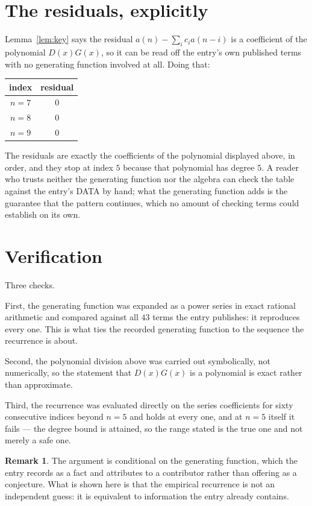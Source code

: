 \documentclass[11pt,a4paper]{article}
\theoremstyle{plain}
\theoremstyle{definition}
\newtheorem{remark}[theorem]{Remark}
\begin{document}
\section{The residuals, explicitly}

Lemma~\ref{lem:key} says the residual $a(n)-\sum_ic_ia(n-i)$ is a coefficient of the
polynomial $D(x)G(x)$, so it can be read off the entry's own published terms with no
generating function involved at all. Doing that:
\begin{center}
\begin{tabular}{cc}
index & residual \\ \hline
$n=7$ & $0$ \\
$n=8$ & $0$ \\
$n=9$ & $0$
\end{tabular}
\end{center}
The residuals are exactly the coefficients of the polynomial displayed above, in order, and
they stop at index $5$ because that polynomial has degree $5$. A reader who trusts
neither the generating function nor the algebra can check the table against the entry's DATA
by hand; what the generating function adds is the guarantee that the pattern continues, which
no amount of checking terms could establish on its own.

\section{Verification}

Three checks.

First, the generating function was expanded as a power series in exact rational arithmetic and
compared against all $43$ terms the entry publishes: it reproduces every one. This is
what ties the recorded generating function to the sequence the recurrence is about.

Second, the polynomial division above was carried out symbolically, not numerically, so the
statement that $D(x)G(x)$ is a polynomial is exact rather than approximate.

Third, the recurrence was evaluated directly on the series coefficients for sixty consecutive
indices beyond $n=5$ and holds at every one, and at $n=5$ itself it fails --- the
degree bound is attained, so the range stated is the true one and not merely a safe one.

\begin{remark}
The argument is conditional on the generating function, which the entry records as a fact and
attributes to a contributor rather than offering as a conjecture. What is shown here is that
the empirical recurrence is not an independent guess: it is equivalent to information the
entry already contains.
\end{remark}
\end{document}
